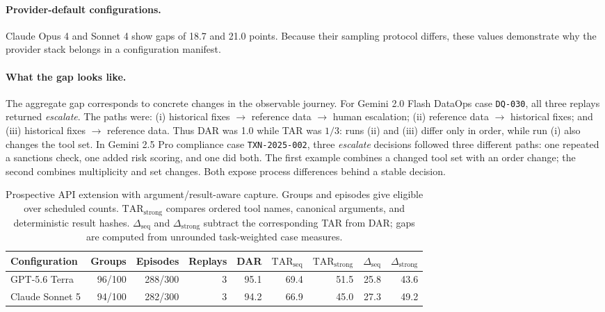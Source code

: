 \documentclass{article}
\newcommand{\tarseq}{\mathrm{TAR}_{\mathrm{seq}}}
\newcommand{\tarstrong}{\mathrm{TAR}_{\mathrm{strong}}}
\begin{document}
\paragraph{Provider-default configurations.}
Claude Opus 4 and Sonnet 4 show gaps of 18.7 and 21.0 points.  Because their
sampling protocol differs, these values demonstrate why the provider stack
belongs in a configuration manifest.

\paragraph{What the gap looks like.}
The aggregate gap corresponds to concrete changes in the observable journey.
For Gemini 2.0 Flash DataOps case \texttt{DQ-030}, all three replays returned
\emph{escalate}.  The paths were: (i) historical fixes $\rightarrow$ reference
data $\rightarrow$ human escalation; (ii) reference data $\rightarrow$
historical fixes; and (iii) historical fixes $\rightarrow$ reference data.
Thus DAR was 1.0 while TAR was $1/3$: runs (ii) and (iii) differ only in
order, while run (i) also changes the tool set.  In Gemini 2.5 Pro compliance
case \texttt{TXN-2025-002}, three \emph{escalate} decisions followed three different paths: one repeated a
sanctions check, one added risk scoring, and one did both.  The first example
combines a changed tool set with an order change; the second combines
multiplicity and set changes.  Both expose process differences behind a
stable decision.

\begin{table}[t]
\caption{Prospective API extension with argument/result-aware capture.
Groups and episodes give eligible over scheduled counts.
\(\tarstrong\) compares ordered tool names, canonical arguments, and
deterministic result hashes.  \(\Delta_{\mathrm{seq}}\) and
\(\Delta_{\mathrm{strong}}\) subtract the corresponding TAR from DAR; gaps are
computed from unrounded task-weighted case measures.}
\label{tab:prospective}
\centering
\small
\begin{tabular}{@{}lrrrrrrrr@{}}
\toprule
Configuration & Groups & Episodes & Replays & DAR & \(\tarseq\) &
\(\tarstrong\) & \(\Delta_{\mathrm{seq}}\) & \(\Delta_{\mathrm{strong}}\) \\
\midrule
GPT-5.6 Terra & 96/100 & 288/300 & 3 & 95.1 & 69.4 & 51.5 & 25.8 & 43.6 \\
Claude Sonnet 5 & 94/100 & 282/300 & 3 & 94.2 & 66.9 & 45.0 & 27.3 & 49.2 \\
\bottomrule
\end{tabular}
\end{table}
\end{document}
